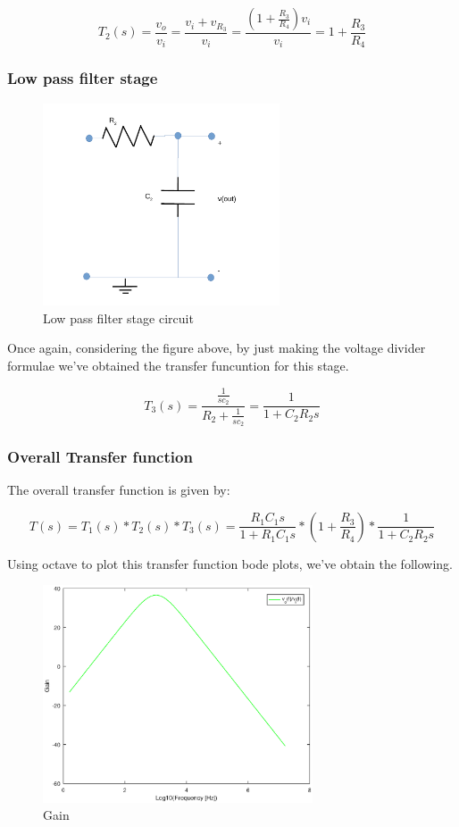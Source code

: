 \begin{equation}
T_2(s) = \frac{v_o}{v_i} = \frac{v_i + v_{R_3}}{v_i} = \frac{(1+\frac{R_3}{R_4})v_i}{v_i} = 1 + \frac{R_3}{R_4}
\end{equation} 

\subsubsection{Low pass filter stage}

\begin{figure}[H] 
\centering
\includegraphics[width= 7cm]{low_pass_l5.pdf} 
\caption{Low pass filter stage circuit}
\label{lowpass}
\end{figure}

Once again, considering the figure above, by just making the voltage divider formulae we've obtained the transfer funcuntion for this stage.

\begin{equation}
T_3(s) = \frac{\frac{1}{sc_2}}{R_2 + \frac{1}{sc_2}} = \frac{1}{1+ C_2R_2s}
\end{equation} 

\subsubsection{Overall Transfer function}

The overall transfer function is given by:

\begin{equation}
T(s) = T_1(s)*T_2(s)*T_3(s) = \frac{R_1C_1s}{1+R_1C_1s}*(1 + \frac{R_3}{R_4})*\frac{1}{1+ C_2R_2s}
\end{equation} 

Using octave to plot this transfer function bode plots, we've obtain the following.

\begin{figure}[H] 
\centering
\includegraphics[width = 8cm]{gain.eps} 
\caption{Gain}
\label{gain}
\end{figure}

